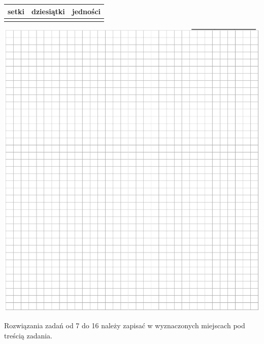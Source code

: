 \documentclass[10pt]{article}
\begin{document}
\begin{center}
\begin{tabular}{|l|l|l|}
\hline
setki & dziesiątki & jedności \\
\hline
 &  &  \\
\hline
\end{tabular}
\end{center}

\begin{center}
\includegraphics[max width=\textwidth]{2024_11_21_498389c978c770348ebcg-04}
\end{center}

Rozwiązania zadań od 7 do 16 należy zapisać w wyznaczonych miejscach pod treścią zadania.
\end{document}
